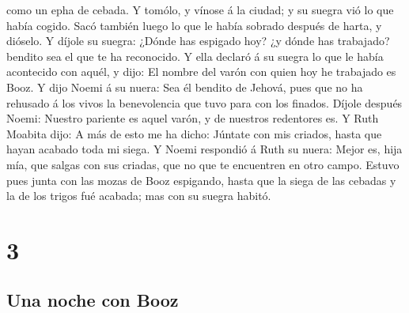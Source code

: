como un epha de cebada.  Y tomólo, y vínose á la ciudad; y
su suegra vió lo que había cogido. Sacó también luego lo que le había
sobrado después de harta, y dióselo.  Y díjole su suegra:
¿Dónde has espigado hoy? ¿y dónde has trabajado? bendito sea el que te
ha reconocido. Y ella declaró á su suegra lo que le había acontecido con
aquél, y dijo: El nombre del varón con quien hoy he trabajado es Booz.
 Y dijo Noemi á su nuera: Sea él bendito de Jehová, pues
que no ha rehusado á los vivos la benevolencia que tuvo para con los
finados. Díjole después Noemi: Nuestro pariente es aquel varón, y de
nuestros redentores es.  Y Ruth Moabita dijo: A más de esto
me ha dicho: Júntate con mis criados, hasta que hayan acabado toda mi
siega.  Y Noemi respondió á Ruth su nuera: Mejor es, hija
mía, que salgas con sus criadas, que no que te encuentren en otro campo.
 Estuvo pues junta con las mozas de Booz espigando, hasta
que la siega de las cebadas y la de los trigos fué acabada; mas con su
suegra habitó.

\hypertarget{section-2}{%
\section{3}\label{section-2}}

\hypertarget{una-noche-con-booz}{%
\subsection{Una noche con Booz}\label{una-noche-con-booz}}

